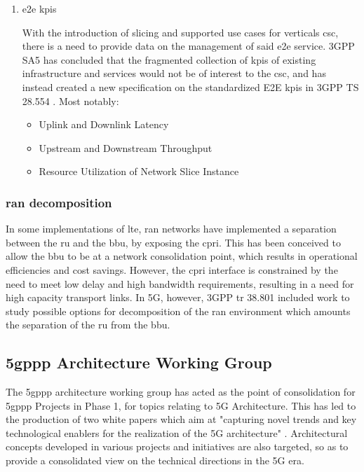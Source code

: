\begin{enumerate}
        \item \acrshort{e2e} \acrshort{kpi}s
        
        With the introduction of slicing and supported use cases for verticals \acrfull{csc}, there is a need to provide data on the management of said \acrshort{e2e} service. 3GPP SA5 has concluded that the fragmented collection of \acrshort{kpi}s of existing infrastructure and services would not be of interest to the \acrshort{csc}, and has instead created a new specification on the standardized E2E \acrshort{kpi}s in 3GPP TS 28.554 \cite{3GPP_TS_28.554}. Most notably: 
        
        \begin{itemize}
          \item Uplink and Downlink Latency
          \item Upstream and Downstream Throughput
          \item Resource Utilization of Network Slice Instance
        \end{itemize}
        
        \end{enumerate}
        
        \subsubsection{\acrfull{ran} decomposition}
        In some implementations of \acrshort{lte}, \acrshort{ran} networks have implemented a separation between the \acrfull{ru} and the \acrfull{bbu}, by exposing the \acrfull{cpri}. This has been conceived to allow the \acrshort{bbu} to be at a network consolidation point, which results in operational efficiencies and cost savings. However, the \acrshort{cpri} interface is constrained by the need to meet low delay and high bandwidth requirements, resulting in a need for high capacity transport links.
        In 5G, however, 3GPP \acrshort{tr} 38.801 \cite{3GPP_TR_38.801} included work to study possible options for decomposition of the \acrshort{ran} environment which amounts the separation of the \acrshort{ru} from the \acrshort{bbu}. 

    \subsection{\acrshort{5gppp} Architecture Working Group}
    
    The \acrshort{5gppp} architecture working group  has acted as the point of consolidation for \acrshort{5gppp} Projects in Phase 1, for topics relating to 5G Architecture. This has led to the production of two white papers which aim at "capturing novel trends and key technological enablers for the realization of the 5G architecture" \cite{view_5g_architecture_v2}. Architectural concepts developed in various projects and initiatives are also targeted, so as to provide a consolidated view on the technical directions in the 5G era.

